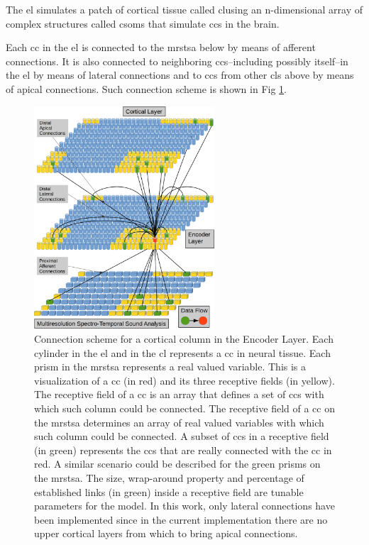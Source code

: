 \documentclass[10pt,letterpaper]{article}
\begin{document}
The \gls{el} simulates a patch of cortical tissue called \gls{cl}using an n-dimensional array of complex structures called \glspl{csom} that simulate \glspl{cc} in the brain.

Each \gls{cc} in the \gls{el} is connected to the \gls{mrstsa} below by means of afferent connections. It is also
connected to neighboring \glspl{cc}--including possibly itself--in the \gls{el} by means of lateral connections and
to \glspl{cc} from other \glspl{cl} above by means of apical connections. Such connection scheme is shown in Fig \ref{fig:EncoderColumnConnections}.

\begin{figure}[h!]
    \centering
    \includegraphics[width=0.6\textwidth]{EncoderColumnConnections.png}
    \caption{Connection scheme for a cortical column in the Encoder Layer.
	    Each cylinder in the \gls{el} and in the \gls{cl} represents a \gls{cc} in neural tissue.
	    Each prism in the \gls{mrstsa} represents a real valued variable.
	    This is a visualization of a \gls{cc} (in red) and its three receptive fields (in yellow).
	    The receptive field of a \gls{cc} is an array that defines a set of \glspl{cc}
	    with which such column could be connected.
	    The receptive field of a \gls{cc} on the \gls{mrstsa} determines an array of real valued variables
	    with which such column could be connected.
    A subset of \glspl{cc} in a receptive field (in green) represents the \glspl{cc} that are really
    connected with the \gls{cc} in red. A similar scenario could be described for the green prisms on
    the \gls{mrstsa}.
    The size, wrap-around property and percentage of established links (in green) inside a receptive field are tunable parameters for the model.
    In this work, only lateral connections have been implemented since in the current implementation there are no upper cortical layers from which
    to bring apical connections.}
    \label{fig:EncoderColumnConnections}
\end{figure}
\end{document}
